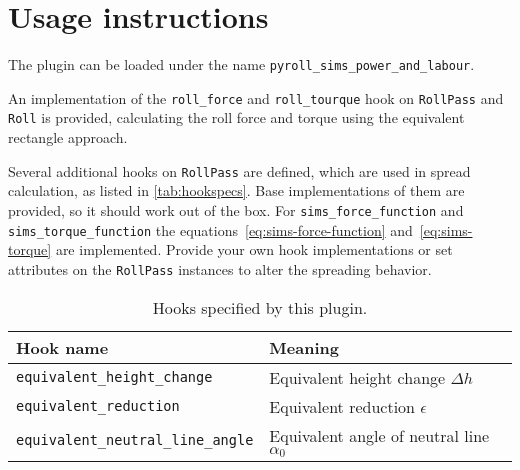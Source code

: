 \documentclass[11pt]{PyRollDocs}
\begin{document}
    \section{Usage instructions}\label{sec:usage-instructions}

    The plugin can be loaded under the name \texttt{pyroll\_sims\_power\_and\_labour}.

    An implementation of the \lstinline{roll_force} and \lstinline{roll_tourque} hook on \lstinline{RollPass} and \lstinline{Roll} is provided,
    calculating the roll force and torque using the equivalent rectangle approach.

    Several additional hooks on \lstinline{RollPass} are defined, which are used in spread calculation, as listed in \autoref{tab:hookspecs}.
    Base implementations of them are provided, so it should work out of the box.
    For \lstinline{sims_force_function} and \lstinline{sims_torque_function} the equations~\ref{eq:sims-force-function} and~\ref{eq:sims-torque} are implemented.
    Provide your own hook implementations or set attributes on the \lstinline{RollPass} instances to alter the spreading behavior.

    \begin{table}
        \centering
        \caption{Hooks specified by this plugin.}
        \label{tab:hookspecs}
        \begin{tabular}{ll}
            \toprule
            Hook name                                 & Meaning                                     \\
            \midrule
            \texttt{equivalent\_height\_change}       & Equivalent height change $\Delta h$         \\
            \texttt{equivalent\_reduction}            & Equivalent reduction $\epsilon$             \\
            \texttt{equivalent\_neutral\_line\_angle} & Equivalent angle of neutral line $\alpha_0$ \\
            \bottomrule
        \end{tabular}
    \end{table}

    \printbibliography
\end{document}
